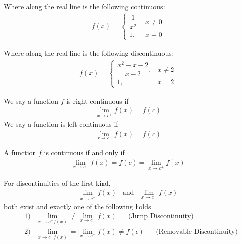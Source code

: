 \begin{exercise}
Where along the real line is the following continuous:
\begin{align*}
    f(x) =
    \begin{cases}
    \dfrac{1}{x^{2}}, &x \neq 0\\
    1, &x = 0
    \end{cases}
\end{align*}
\end{exercise}

\begin{exercise}
Where along the real line is the following discontinuous:
\begin{align*}
    f(x) = 
    \begin{cases}
    \dfrac{x^{2}-x-2}{x-2}, &x \neq 2 \\
    1, & x=2
    \end{cases}
\end{align*}
\end{exercise}

\begin{definition}
We say a function $f$ is right-continuous if
\begin{align*}
    \lim_{x \longrightarrow c^{+}} f(x) = f(c)
\end{align*}
We say a function is left-continuous if
\begin{align*}
    \lim_{x \longrightarrow c^{-}} f(x) = f(c)
\end{align*}
\end{definition}

\begin{theorem}
A function $f$ is continuous if and only if
\begin{align*}
    \lim_{x \longrightarrow c^{-}} f(x) = f(c) = \lim_{x \longrightarrow c^{+}} f(x) 
\end{align*}
\end{theorem}

\begin{definition}
For discontinuities of the first kind, 
\begin{align*}
    \lim_{x \longrightarrow c^{+}} f(x) \hspace{10pt} \text{and} \hspace{10pt} \lim_{x \longrightarrow c^{-}} f(x)
\end{align*}
both exist and exactly one of the following holds
\begin{align*}
    &1) \hspace{10pt} \lim_{x \longrightarrow c^{+} f(x)} \neq \lim_{x \longrightarrow c^{-}} f(x) \hspace{20pt} \text{(Jump Discontinuity)}\\[2ex]
    &2) \hspace{10pt} \lim_{x \longrightarrow c^{+} f(x)} = \lim_{x \longrightarrow c^{-}} f(x) \neq f(c) \hspace{20pt} \text{(Removable Discontinuity)}
\end{align*}
\end{definition}

